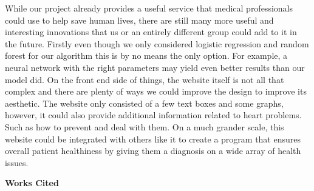 \documentclass[12pt]{article}
\begin{document}
While our project already provides a useful service that medical professionals could use to help save human lives, there are still many more useful and interesting innovations that us or an entirely different group could add to it in the future. Firstly even though we only considered logistic regression and random forest for our algorithm this is by no means the only option. For example, a neural network with the right parameters may yield even better results than our model did. On the front end side of things, the website itself is not all that complex and there are plenty of ways we could improve the design to improve its aesthetic. The website only consisted of a few text boxes and some graphs, however, it could also provide additional information related to heart problems. Such as how to prevent and deal with them. On a much grander scale, this website could be integrated with others like it to create a program that ensures overall patient healthiness by giving them a diagnosis on a wide array of health issues.

\newpage
\begin{center}
    \textbf{Works Cited}
\end{center}
\end{document}
